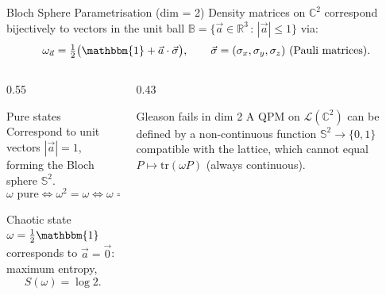 \documentclass{beamer}
\newcommand{\tr}{\mathrm{tr}}
\newcommand{\ket}[1]{|#1\rangle}
\newcommand{\bra}[1]{\langle#1|}
\begin{document}
\begin{frame}[shrink=10]{Bloch Sphere Parametrisation (dim = 2)}
  Density matrices on $\mathbb{C}^2$ correspond bijectively to vectors in the unit ball
  $\mathbb{B}=\{\vec{a}\in\mathbb{R}^3\,:\,|\vec{a}|\le 1\}$ via:
  \[
    \omega_{\vec{a}} = \tfrac{1}{2}\bigl(\mathbbm{1}+\vec{a}\cdot\vec{\sigma}\bigr),
    \qquad \vec\sigma=(\sigma_x,\sigma_y,\sigma_z) \text{ (Pauli matrices)}.
  \]

  \begin{columns}[T]
    \begin{column}{0.55\textwidth}
      \begin{block}{Pure states}
        Correspond to unit vectors $|\vec{a}|=1$, forming the Bloch sphere $\mathbb{S}^2$.
        \[
          \omega \text{ pure} \Leftrightarrow \omega^2=\omega \Leftrightarrow \omega=\ket\psi\bra\psi
        \]
      \end{block}
      \begin{block}{Chaotic state}
        $\omega = \tfrac{1}{2}\mathbbm{1}$ corresponds to $\vec a=\vec 0$: maximum entropy,
        \[S(\omega)=\log 2.\]
      \end{block}
    \end{column}
    \begin{column}{0.43\textwidth}
      \begin{alertblock}{Gleason fails in dim 2}
      \justifying
        A QPM on $\mathcal{L}(\mathbb{C}^2)$ can be defined by a
        non-continuous function $\mathbb{S}^2\to\{0,1\}$
        compatible with the lattice, which cannot equal
        $P\mapsto\tr(\omega P)$ (always continuous).
      \end{alertblock}
    \end{column}
  \end{columns}
\end{frame}
\end{document}
